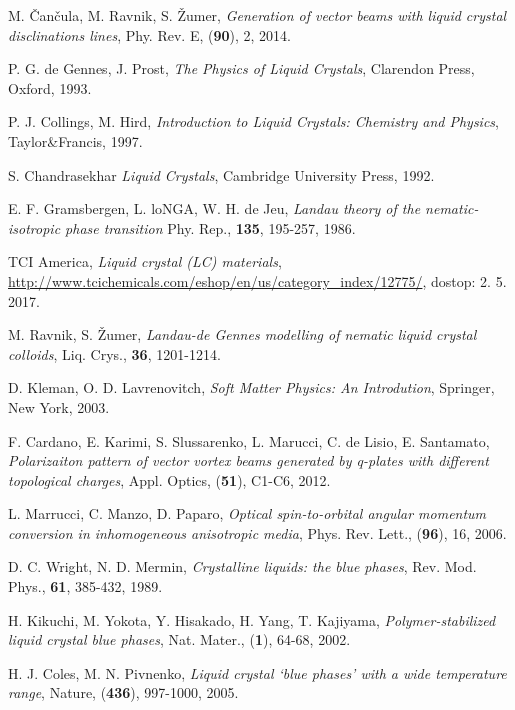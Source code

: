 \documentclass[longbibliography,slovene,a4paper,12pt]{book}
\begin{document}
\begin{thebibliography}{15}
	M. Čančula, M. Ravnik, S. Žumer,
	\emph{Generation of vector beams with liquid crystal disclinations lines},
	Phy. Rev. E, (\textbf{90}), 2, 2014. 

	P. G. de Gennes, J. Prost,
	\emph{The Physics of Liquid Crystals},
	Clarendon Press, Oxford, 1993.
	
	P. J. Collings, M. Hird,
	\emph{Introduction to Liquid Crystals: Chemistry and Physics},
	Taylor\&Francis, 1997.
	
	S. Chandrasekhar
	\emph{Liquid Crystals},
	Cambridge University Press, 1992.
	
	E. F. Gramsbergen, L. loNGA, W. H. de Jeu,
	\emph{Landau theory of the nematic-isotropic phase transition}
	Phy. Rep., \textbf{135}, 195-257, 1986.
	
	TCI America,
	\emph{Liquid crystal (LC) materials},
	\url{http://www.tcichemicals.com/eshop/en/us/category_index/12775/}, dostop: 2. 5. 2017.

	M. Ravnik, S. Žumer,
	\emph{Landau-de Gennes modelling of nematic liquid crystal colloids},
	Liq. Crys., \textbf{36}, 1201-1214.
	
	D. Kleman, O. D. Lavrenovitch,
	\emph{Soft Matter Physics: An Introdution},
	Springer, New York, 2003.

	F. Cardano, E. Karimi, S. Slussarenko, L. Marucci, C. de Lisio, E. Santamato,
	\emph{Polarizaiton pattern of vector vortex beams generated by q-plates with different topological charges},
	Appl. Optics, (\textbf{51}), C1-C6, 2012.
	
	L. Marrucci, C. Manzo, D. Paparo,
	\emph{Optical spin-to-orbital angular momentum conversion in inhomogeneous anisotropic media},
	Phys. Rev. Lett., (\textbf{96}), 16, 2006.

	D. C. Wright, N. D. Mermin,
	\emph{Crystalline liquids: the blue phases},
	Rev. Mod. Phys., \textbf{61}, 385-432, 1989.

	H. Kikuchi, M. Yokota, Y. Hisakado, H. Yang, T. Kajiyama,
	\emph{Polymer-stabilized liquid crystal blue phases}, 
	Nat. Mater., (\textbf{1}), 64-68, 2002.

	H. J. Coles, M. N. Pivnenko,
	\emph{Liquid crystal `blue phases' with a wide temperature range}, 
	Nature, (\textbf{436}), 997-1000, 2005.


\end{thebibliography}
\end{document}

